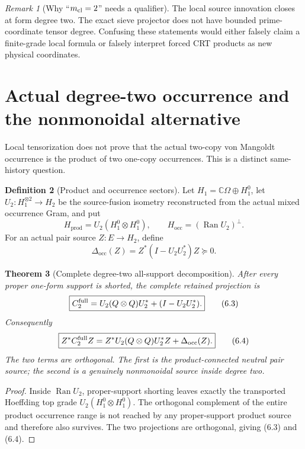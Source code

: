 \documentclass[11pt]{article}
\newtheorem{theorem}{Theorem}[section]
\theoremstyle{definition}
\newtheorem{definition}[theorem]{Definition}
\theoremstyle{remark}
\newtheorem{remark}[theorem]{Remark}
\newcommand{\C}{\mathbb C}
\newcommand{\Ran}{\operatorname{Ran}}
\newcommand{\occ}{\mathrm{occ}}
\newcommand{\prodsec}{\mathrm{prod}}
\begin{document}
\begin{remark}[Why ``$m_{\rm cl}=2$'' needs a qualifier]
The local source innovation closes at form degree two.  The exact sieve
projector does not have bounded prime-coordinate tensor degree.  Confusing
these statements would either falsely claim a finite-grade local formula or
falsely interpret forced CRT products as new physical coordinates.
\end{remark}

\section{Actual degree-two occurrence and the nonmonoidal alternative}
\label{sec:occurrence}

Local tensorization does not prove that the actual two-copy von Mangoldt
occurrence is the product of two one-copy occurrences.  This is a distinct
same-history question.

\begin{definition}[Product and occurrence sectors]
Let $H_1=\C\Omega\oplus H_1^0$, let
$U_2:H_1^{\otimes2}\to H_2$ be the source-fusion isometry reconstructed from
the actual mixed occurrence Gram, and put
\[
 H_{\prodsec}=U_2(H_1^0\otimes H_1^0),
 \qquad
 H_{\occ}=(\Ran U_2)^\perp.
 \tag{6.1}
\]
For an actual pair source $Z:E\to H_2$, define
\[
 \Delta_{\occ}(Z)=Z^*(I-U_2U_2^*)Z\succeq0.
 \tag{6.2}
\]
\end{definition}

\begin{theorem}[Complete degree-two all-support decomposition]
\label{thm:degree-two-decomposition}
After every proper one-form support is shorted, the complete retained
projection is
\[
 \boxed{
 C_2^{\rm full}
 =U_2(Q\otimes Q)U_2^*+(I-U_2U_2^*).}
 \tag{6.3}
\]
Consequently
\[
 \boxed{
 Z^*C_2^{\rm full}Z
 =Z^*U_2(Q\otimes Q)U_2^*Z+\Delta_{\occ}(Z).}
 \tag{6.4}
\]
The two terms are orthogonal.  The first is the product-connected neutral pair
source; the second is a genuinely nonmonoidal source inside degree two.
\end{theorem}

\begin{proof}
Inside $\Ran U_2$, proper-support shorting leaves exactly the transported
Hoeffding top grade $U_2(H_1^0\otimes H_1^0)$.  The orthogonal complement of
the entire product occurrence range is not reached by any proper-support
product source and therefore also survives.  The two projections are
orthogonal, giving \textup{(6.3)} and \textup{(6.4)}.
\end{proof}
\end{document}
